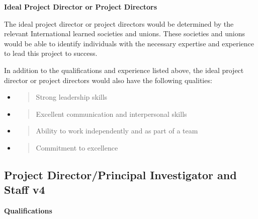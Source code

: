 \textbf{Ideal Project Director or Project Directors}

The ideal project director or project directors would be determined by
the relevant International learned societies and unions. These societies
and unions would be able to identify individuals with the necessary
expertise and experience to lead this project to success.

In addition to the qualifications and experience listed above, the ideal
project director or project directors would also have the following
qualities:

\begin{itemize}
\item
  \begin{quote}
  Strong leadership skills
  \end{quote}
\item
  \begin{quote}
  Excellent communication and interpersonal skills
  \end{quote}
\item
  \begin{quote}
  Ability to work independently and as part of a team
  \end{quote}
\item
  \begin{quote}
  Commitment to excellence
  \end{quote}
\end{itemize}

\hypertarget{project-directorprincipal-investigator-and-staff-v4}{%
\subsection{Project Director/Principal Investigator and Staff
v4}\label{project-directorprincipal-investigator-and-staff-v4}}

\textbf{Qualifications}

